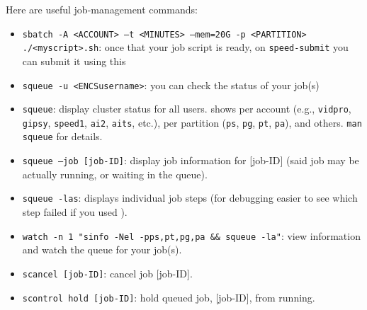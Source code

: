 Here are useful job-management commands: 

\begin{itemize}
\item
\texttt{sbatch -A <ACCOUNT> --t <MINUTES> --mem=20G -p <PARTITION> ./<myscript>.sh}: once that your job script is ready,
on \texttt{speed-submit} you can submit it using this

\item
\texttt{squeue -u <ENCSusername>}: you can check the status of your job(s)

\item
\texttt{squeue}: display cluster status for all users. 
 shows per account (e.g., \texttt{vidpro}, \texttt{gipsy},
\texttt{speed1}, \texttt{ai2}, \texttt{aits}, etc.),
 per partition (\texttt{ps}, \texttt{pg}, \texttt{pt}, \texttt{pa}),
and others. \texttt{man squeue} for details.

\item
\texttt{squeue --job [job-ID]}: display job information for [job-ID] (said job may be actually running, or waiting in the queue). 

\item
\texttt{squeue -las}: displays individual job steps (for debugging
easier to see which step failed if you used ).

\item
\verb+watch -n 1 "sinfo -Nel -pps,pt,pg,pa && squeue -la"+: view  information and watch the queue for your job(s).

\item
\texttt{scancel [job-ID]}: cancel job [job-ID]. 

\item
\texttt{scontrol hold [job-ID]}: hold queued job, [job-ID], from running. 


\end{itemize}
